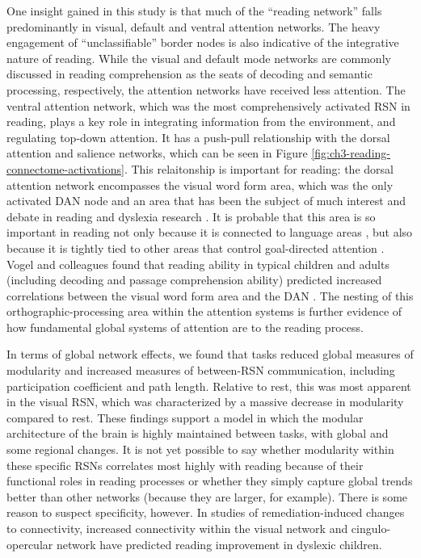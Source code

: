 One insight gained in this study is that much of the ``reading network'' falls predominantly in visual, default and ventral attention networks. The heavy engagement of ``unclassifiable'' border nodes is also indicative of the integrative nature of reading. While the visual and default mode networks are commonly discussed in reading comprehension as the seats of decoding and semantic processing, respectively, the attention networks have received less attention. The ventral attention network, which was the most comprehensively activated RSN in reading, plays a key role in integrating information from the environment, and regulating top-down attention. It has a push-pull relationship with the dorsal attention and salience networks, which can be seen in Figure \ref{fig:ch3-reading-connectome-activations}. This relaitonship is important for reading: the dorsal attention network encompasses the visual word form area, which was the only activated DAN node and an area that has been the subject of much interest and debate in reading and dyslexia research \citep{McCandliss2003}. It is probable that this area is so important in reading not only because it is connected to language areas \citep{Bouhali2014}, but also because it is tightly tied to other areas that control goal-directed attention \citep{Vogel2014}. Vogel and colleagues found that reading ability in typical children and adults (including decoding and passage comprehension ability) predicted increased correlations between the visual word form area and the DAN \citep{Vogel2012a}. The nesting of this orthographic-processing area within the attention systems is further evidence of how fundamental global systems of attention are to the reading process.

In terms of global network effects, we found that tasks reduced global measures of modularity and increased measures of between-RSN communication, including participation coefficient and path length. Relative to rest, this was most apparent in the visual RSN, which was characterized by a massive decrease in modularity compared to rest. These findings support a model in which the modular architecture of the brain is highly maintained between tasks, with global and some regional changes. It is not yet possible to say whether modularity within these specific RSNs correlates most highly with reading because of their functional roles in reading processes or whether they simply capture global trends better than other networks (because they are larger, for example). There is some reason to suspect specificity, however. In studies of remediation-induced changes to connectivity, increased connectivity within the visual network \citep{Koyama2013} and cingulo-opercular network \citep{HorowitzKraus2015} have predicted reading improvement in dyslexic children.

